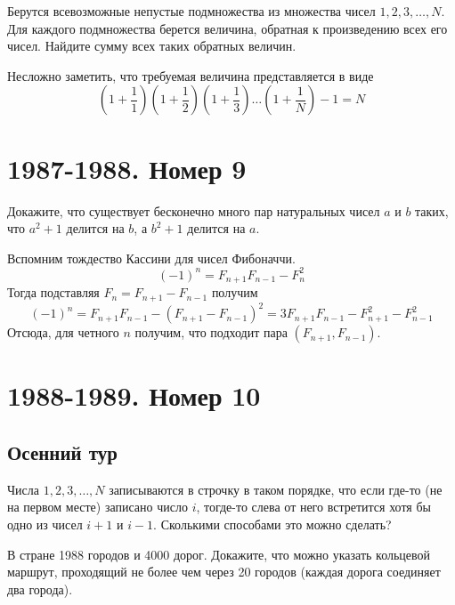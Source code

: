 \documentclass[11pt, a4paper]{common/document_template}
\begin{document}
\begin{exercise}
Берутся всевозможные непустые подмножества из множества чисел $1, 2, 3, \dots, N$. Для каждого подмножества берется величина, обратная к произведению всех его чисел. Найдите сумму всех таких обратных величин.
\end{exercise}

\begin{Solution}
Несложно заметить, что требуемая величина представляется в виде
$$
\left(1 + \frac{1}{1}\right)\left(1 + \frac{1}{2}\right)\left(1 + \frac{1}{3}\right)\dots \left(1 + \frac{1}{N}\right) - 1 = N
$$
\end{Solution}

\chapter{1987-1988. Номер 9}

\begin{exercise}
Докажите, что существует бесконечно много пар натуральных чисел $a$ и $b$ таких, что $a^{2} + 1$ делится на $b$, а $b^{2} + 1$ делится на $a$.
\end{exercise}

\begin{Solution}
Вспомним тождество Кассини для чисел Фибоначчи.
$$
(-1)^{n} = F_{n+1}F_{n-1} - F_{n}^{2}
$$
Тогда подставляя $F_{n} = F_{n+1} - F_{n-1}$ получим
$$
(-1)^{n} = F_{n+1}F_{n-1} - (F_{n+1} - F_{n-1})^{2} = 3F_{n+1}F_{n-1}-F_{n+1}^{2} - F_{n-1}^{2}
$$
Отсюда, для четного $n$ получим, что подходит пара $(F_{n+1}, F_{n-1})$. 
\end{Solution}

\chapter{1988-1989. Номер 10}

\section{Осенний тур}

\begin{exercise}
Числа $1, 2, 3, \dots, N$ записываются в строчку в таком порядке, что если где-то (не на первом месте) записано число $i$, тогде-то слева от него встретится хотя бы одно из чисел $i+1$ и $i-1$. Сколькими способами это можно сделать?
\end{exercise}

\begin{exercise}
В стране 1988 городов и 4000 дорог. Докажите, что можно указать кольцевой маршрут, проходящий не более чем через 20 городов (каждая дорога соединяет два города).
\end{exercise}
\end{document}
